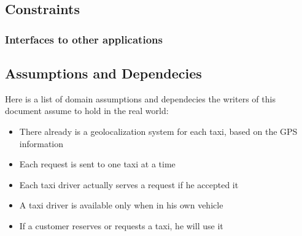 \pagebreak
\subsection{Constraints}

\subsubsection{Interfaces to other applications}

\subsection{Assumptions and Dependecies}
Here is a list of domain assumptions and dependecies the writers of this document assume to hold in the real world:
\begin{itemize}
\item There already is a geolocalization system for each taxi, based on the GPS information
\item Each request is sent to one taxi at a time
\item Each taxi driver actually serves a request if he accepted it
\item A taxi driver is available only when in his own vehicle 
\item If a customer reserves or requests a taxi, he will use it

\end{itemize}

